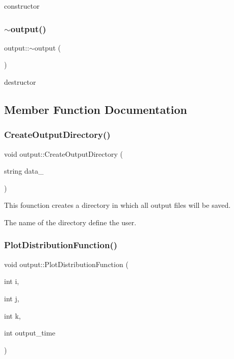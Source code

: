 constructor 

\mbox{\label{classoutput_a521a9799a4d0bc73b860ca8c3694ef7c}} 
\subsubsection{\texorpdfstring{$\sim$output()}{~output()}}
{\footnotesize\ttfamily output\+::$\sim$output (\begin{DoxyParamCaption}{ }\end{DoxyParamCaption})}



destructor 



\subsection{Member Function Documentation}
\mbox{\label{classoutput_ad0585ef8d22cf587dfe95acb9445bab8}} 
\subsubsection{\texorpdfstring{Create\+Output\+Directory()}{CreateOutputDirectory()}}
{\footnotesize\ttfamily void output\+::\+Create\+Output\+Directory (\begin{DoxyParamCaption}\item[{string}]{data\+\_\+ }\end{DoxyParamCaption})}



This founction creates a directory in which all output files will be saved. 

The name of the directory define the user. \mbox{\label{classoutput_a6741e4645701f96a3b9174fb5ab9dd54}} 
\subsubsection{\texorpdfstring{Plot\+Distribution\+Function()}{PlotDistributionFunction()}}
{\footnotesize\ttfamily void output\+::\+Plot\+Distribution\+Function (\begin{DoxyParamCaption}\item[{int}]{i,  }\item[{int}]{j,  }\item[{int}]{k,  }\item[{int}]{output\+\_\+time }\end{DoxyParamCaption})}



